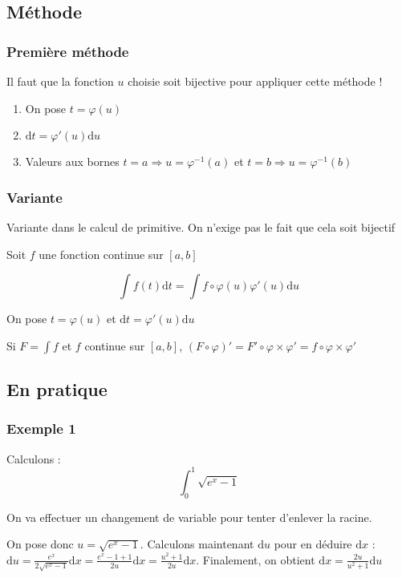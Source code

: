 \documentclass[french]{yLectureNote}
\begin{document}
\subsection{Méthode}
\subsubsection{Première méthode}
Il faut que la fonction $u$ choisie soit bijective pour appliquer cette méthode !
\begin{enumerate}
 \item On pose $t = \varphi(u)$
 \item $\mathrm{d}t = \varphi'(u)\mathrm{d}u$
 \item Valeurs aux bornes $t=a \Rightarrow u = \varphi^{-1}(a)$ et $t=b \Rightarrow u = \varphi^{-1}(b)$
\end{enumerate}
\subsubsection{Variante}
Variante dans le calcul de primitive. On n'exige pas le fait que cela soit bijectif

Soit $f$ une fonction continue sur $[a,b]$

\[\int f(t)\mathrm{d}t = \int f\circ \varphi (u) \varphi'(u)\mathrm{d}u\]

On pose $t = \varphi(u)$ et $\mathrm{d}t = \varphi'(u)\mathrm{d}u$

Si $F = \int f$ et $f$ continue sur $[a,b]$, $(F\circ \varphi)' = F'\circ \varphi \times \varphi' = f\circ \varphi \times \varphi'$
\subsection{En pratique}
\subsubsection{Exemple 1}
Calculons : \[\int^1_0 \sqrt{e^x-1}\]

On va effectuer un changement de variable pour tenter d'enlever la racine.

On pose donc $u=\sqrt{e^x-1}$. Calculons maintenant $\mathrm{d}u$ pour en déduire $\mathrm{d}x$ : $\mathrm{d}u = \frac{e^x}{2\sqrt{e^x-1}}\mathrm{d}x = \frac{e^x-1 +1}{2u}\mathrm{d}x = \frac{u^2 +1}{2u}\mathrm{d}x$.
Finalement, on obtient $\mathrm{d}x = \frac{2u}{u^2+1} \mathrm{d}u$
\end{document}

